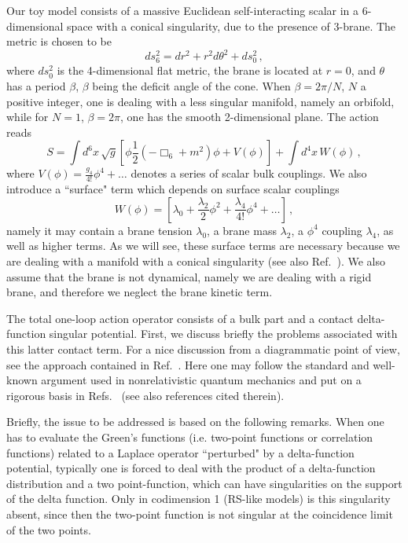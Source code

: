 \documentclass[a4paper,aps,prl,preprint,groupedaddress,showpacs,nobibnotes,tightenlines]{revtex4}
\begin{document}
Our toy model consists of a massive Euclidean self-interacting scalar in 
a 6-dimensional space with a conical singularity, due to the
presence of 3-brane. The metric is chosen to be
\begin{equation}
ds_6^2=dr^2+r^2d\theta^2+ds^2_0\,,
\label{111}
\end{equation}
where $ds^2_0$ is the 4-dimensional flat metric,  
the brane is located at $r=0$, and $\theta$ has a period $\beta$, $\beta $ being
the deficit angle of the cone. When $\beta=2 \pi/N$, $N$ a positive integer,
one is dealing with a less singular manifold, namely an orbifold, 
while for $N=1$, $\beta= 2\pi$, one  has the smooth 2-dimensional plane.
The action  reads
\begin{equation}
S= \int d^6x\, \sqrt{g} \left[ \phi  \frac{1}{2}(-\Box_6+m^2  ) \phi+
V(\phi) \right]+\int d^4x\, W(\phi)\,,  
\label{2}
\end{equation}
where $V(\phi)=\frac{g_4}{4!}\phi^4+\dots$ denotes a series of 
scalar  bulk couplings. We also introduce 
 a ``surface" term which depends on surface scalar couplings
\begin{equation}
W(\phi)=\left[\lambda_0+\frac{\lambda_2}{2} \phi^2+\frac{\lambda_4}{4!} 
\phi^4+\dots\right]\,,  
\end{equation}
namely it may contain a brane tension $\lambda_0$, a brane mass  
$\lambda_2$, a $\phi^4$ coupling $\lambda_4$, as well as higher terms.
As we will see, these surface terms are necessary because we are dealing 
with a manifold with a conical singularity (see also Ref.~\cite{georgi}).
We also assume that the brane is not dynamical, namely we are dealing 
with a rigid brane, and therefore we  neglect the brane kinetic term.

The total one-loop action operator consists of a bulk part and a contact 
delta-function singular potential. First, we discuss briefly the problems 
associated with 
this latter contact term. For a nice discussion from a diagrammatic point of 
view, see the approach contained in Ref.~\cite{wise}.
Here one may follow the standard and well-known   argument used in 
nonrelativistic 
quantum mechanics and put on a rigorous basis in 
Refs.~\cite{faddeev,albeverio} (see also references cited therein).

Briefly, the issue to be addressed is based on the following remarks. 
When one has  to evaluate the Green's functions (i.e. two-point functions or 
correlation functions)  related to a Laplace operator ``perturbed" by a 
delta-function potential, typically one is forced to deal with the product of 
a delta-function distribution and a two point-function, 
which can have singularities on 
the support of the delta function. Only in codimension 1 (RS-like models) 
is this singularity absent, since then 
the two-point function is not singular at 
the coincidence limit of the two points.  
\end{document}

